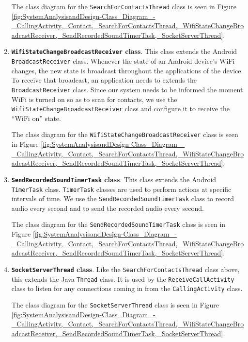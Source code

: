 \documentclass[12pt,svgnames,smaller]{article} %
\begin{document}
\begin{enumerate}
		The class diagram for the \texttt{SearchForContactsThread} class is seen in Figure \ref{fig:SystemAnalysisandDesign-Class_Diagram_-_CallingActivity,_Contact,_SearchForContactsThread,_WifiStateChangeBroadcastReceiver,_SendRecordedSoundTimerTask,_SocketServerThread}.
		
		\item \textbf{\texttt{WifiStateChangeBroadcastReceiver} class}. This class extends the Android \texttt{BroadcastReceiver} class. Whenever the state of an Android device's WiFi changes, the new state is broadcast throughout the applications of the device. To receive that broadcast, an application needs to extends the \texttt{BroadcastReceiver} class. Since our system needs to be informed the moment WiFi is turned on so as to scan for contacts, we use the  \texttt{WifiStateChangeBroadcastReceiver} class and configure it to receive the “WiFi on” state.
		
		The class diagram for the \texttt{WifiStateChangeBroadcastReceiver} class is seen in Figure \ref{fig:SystemAnalysisandDesign-Class_Diagram_-_CallingActivity,_Contact,_SearchForContactsThread,_WifiStateChangeBroadcastReceiver,_SendRecordedSoundTimerTask,_SocketServerThread}.
		
		\item \textbf{\texttt{SendRecordedSoundTimerTask} class}. This class extends the Android \texttt{TimerTask} class. \texttt{TimerTask} classes are used to perform actions at specific intervals of time. We use the \texttt{SendRecordedSoundTimerTask} class to record audio every second and to send the recorded audio every second.
		
		The class diagram for the \texttt{SendRecordedSoundTimerTask} class is seen in Figure \ref{fig:SystemAnalysisandDesign-Class_Diagram_-_CallingActivity,_Contact,_SearchForContactsThread,_WifiStateChangeBroadcastReceiver,_SendRecordedSoundTimerTask,_SocketServerThread}.
		
		\item \textbf{\texttt{SocketServerThread} class}. Like the \texttt{SearchForContactsThread} class above, this extends the Java \texttt{Thread} class. It is used by the \texttt{ReceiveCallActivity} class to listen for any connections coming in from the \texttt{CallingActivity} class. 
		
		The class diagram for the \texttt{SocketServerThread} class is seen in Figure \ref{fig:SystemAnalysisandDesign-Class_Diagram_-_CallingActivity,_Contact,_SearchForContactsThread,_WifiStateChangeBroadcastReceiver,_SendRecordedSoundTimerTask,_SocketServerThread}.
		
	\end{enumerate}
	
\end{document}
